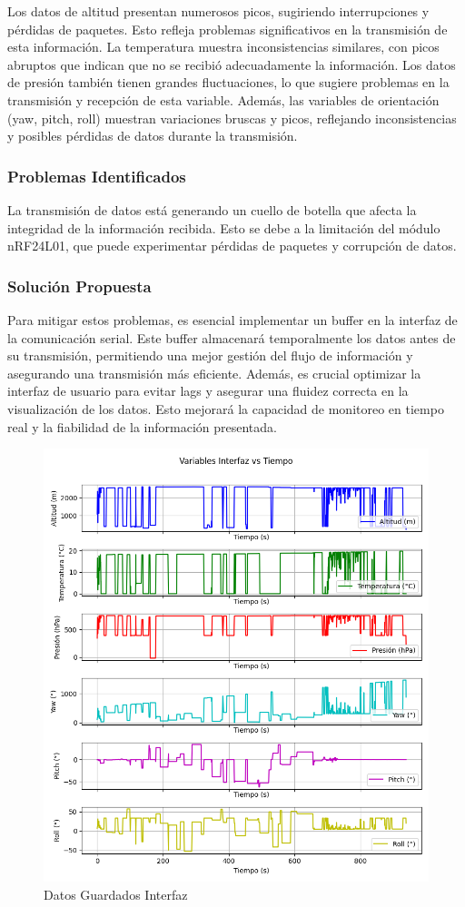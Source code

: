 Los datos de altitud presentan numerosos picos, sugiriendo interrupciones y pérdidas de paquetes. Esto refleja problemas significativos en la transmisión de esta información. La temperatura muestra inconsistencias similares, con picos abruptos que indican que no se recibió adecuadamente la información. Los datos de presión también tienen grandes fluctuaciones, lo que sugiere problemas en la transmisión y recepción de esta variable. Además, las variables de orientación (yaw, pitch, roll) muestran variaciones bruscas y picos, reflejando inconsistencias y posibles pérdidas de datos durante la transmisión.

\subsubsection{Problemas Identificados}
La transmisión de datos está generando un cuello de botella que afecta la integridad de la información recibida. Esto se debe a la limitación del módulo nRF24L01, que puede experimentar pérdidas de paquetes y corrupción de datos.

\subsubsection{Solución Propuesta}
Para mitigar estos problemas, es esencial implementar un buffer en la interfaz de la comunicación serial. Este buffer almacenará temporalmente los datos antes de su transmisión, permitiendo una mejor gestión del flujo de información y asegurando una transmisión más eficiente. Además, es crucial optimizar la interfaz de usuario para evitar lags y asegurar una fluidez correcta en la visualización de los datos. Esto mejorará la capacidad de monitoreo en tiempo real y la fiabilidad de la información presentada.

\begin{figure}[H]
    \centering
    \includegraphics[width=\textwidth]{Imagenes/Vuelo/subplots_interfaz.png}
    \caption{Datos Guardados Interfaz}
    \label{fig:Datos guardados Interfaz}
\end{figure}